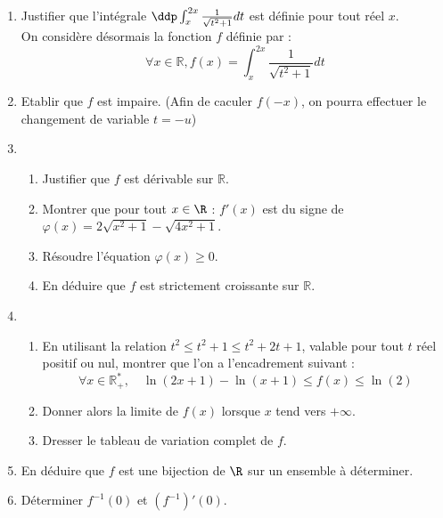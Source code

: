 \documentclass[a4paper, 11pt,reqno]{article}
\begin{document}
\begin{exercice}
\begin{enumerate}
\item Justifier que l'intégrale $\ddp \int_x^{2 x} \frac{1}{\sqrt{t^2+1}} d t$ est définie pour tout réel $x$.\\
On considère désormais la fonction $f$ définie par :
$$
\forall x \in \mathbb{R}, f(x)=\int_x^{2 x} \frac{1}{\sqrt{t^2+1}} d t
$$
\item  Etablir que $f$ est impaire. (Afin de caculer $f(-x)$, on pourra effectuer le changement de variable $t=-u$)
\item \begin{enumerate}
\item Justifier que $f$ est  dérivable  sur $\mathbb{R}$.
\item Montrer que pour tout $x\in \R$ :
$f'(x) $ est du signe de $\varphi(x)= 2\sqrt{x^2+1} -\sqrt{4x^2+1}$. 
\item Résoudre l'équation $\varphi(x)\geq 0$.
\item  En déduire que $f$ est strictement croissante sur $\mathbb{R}$.
\end{enumerate}
\item 
\begin{enumerate}
\item En utilisant la relation $t^2 \leqslant t^2+1 \leqslant t^2+2 t+1$, valable pour tout $t$ réel positif ou nul, montrer que l'on a l'encadrement suivant :
$$
\forall x \in \mathbb{R}_{+}^*, \quad \ln (2 x+1)-\ln (x+1) \leqslant f(x) \leqslant \ln (2)
$$
\item Donner alors la limite de $f(x)$ lorsque $x$ tend vers $+\infty$.
\item Dresser le tableau de variation complet de $f$.
\end{enumerate}
\item En déduire que $f$ est une bijection de $\R$ sur un ensemble à déterminer. 
\item Déterminer $f^{-1} (0) $ et  $(f^{-1})' (0)$.
\end{enumerate}
\end{exercice}
\end{document}
